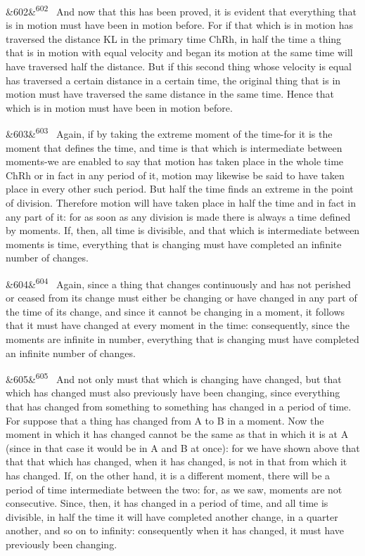 \documentclass[12pt]{article}
\newcommand{\para}[1][]{\par\noindent\ifx&#1&\else\textsuperscript{\footnotesize #1}~\fi}
\begin{document}
\para[602] And now that this has been proved, it is evident that everything that is in motion must have been in motion before. For if that which is in motion has traversed the distance KL in the primary time ChRh, in half the time a thing that is in motion with equal velocity and began its motion at the same time will have traversed half the distance. But if this second thing whose velocity is equal has traversed a certain distance in a certain time, the original thing that is in motion must have traversed the same distance in the same time. Hence that which is in motion must have been in motion before.

\para[603] Again, if by taking the extreme moment of the time-for it is the moment that defines the time, and time is that which is intermediate between moments-we are enabled to say that motion has taken place in the whole time ChRh or in fact in any period of it, motion may likewise be said to have taken place in every other such period. But half the time finds an extreme in the point of division. Therefore motion will have taken place in half the time and in fact in any part of it: for as soon as any division is made there is always a time defined by moments. If, then, all time is divisible, and that which is intermediate between moments is time, everything that is changing must have completed an infinite number of changes.

\para[604] Again, since a thing that changes continuously and has not perished or ceased from its change must either be changing or have changed in any part of the time of its change, and since it cannot be changing in a moment, it follows that it must have changed at every moment in the time: consequently, since the moments are infinite in number, everything that is changing must have completed an infinite number of changes.

\para[605] And not only must that which is changing have changed, but that which has changed must also previously have been changing, since everything that has changed from something to something has changed in a period of time. For suppose that a thing has changed from A to B in a moment. Now the moment in which it has changed cannot be the same as that in which it is at A (since in that case it would be in A and B at once): for we have shown above that that that which has changed, when it has changed, is not in that from which it has changed. If, on the other hand, it is a different moment, there will be a period of time intermediate between the two: for, as we saw, moments are not consecutive. Since, then, it has changed in a period of time, and all time is divisible, in half the time it will have completed another change, in a quarter another, and so on to infinity: consequently when it has changed, it must have previously been changing.
\end{document}

